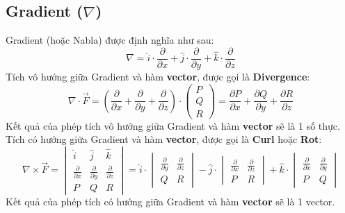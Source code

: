 \documentclass{article}
\begin{document}
\subsection{Gradient ($\nabla$)}
Gradient (hoặc Nabla) được định nghĩa như sau: 
\[\nabla = \hat{i}\cdot\frac{\partial}{\partial x}+\hat{j}\cdot\frac{\partial}{\partial y}+\hat{k}\cdot\frac{\partial}{\partial z}\]
Tích vô hướng giữa Gradient và hàm \textbf{vector}, được gọi là \textbf{Divergence}: 
\[\nabla\cdot \vec{F} = (\frac{\partial}{\partial x} + \frac{\partial}{\partial y} + \frac{\partial}{\partial z})\cdot\begin{pmatrix}
    P\\Q\\R
\end{pmatrix}=\frac{\partial P}{\partial x}+\frac{\partial Q}{\partial y}+\frac{\partial R}{\partial z}\]
Kết quả của phép tích vô hướng giữa Gradient và hàm \textbf{vector} sẽ là 1 số thực.\newline
Tích có hướng giữa Gradient và hàm \textbf{vector}, được gọi là \textbf{Curl} hoặc \textbf{Rot}: 
\[\nabla \times \vec{F}=\begin{vmatrix}
    \hat{i}&\hat{j}&\hat{k}\\
    \frac{\partial}{\partial x}&\frac{\partial}{\partial y}&\frac{\partial}{\partial z}\\
    P&Q&R
\end{vmatrix}=\hat{i}\cdot\begin{vmatrix}
    \frac{\partial}{\partial y}&\frac{\partial}{\partial z}\\
    Q&R
\end{vmatrix}-\hat{j}\cdot\begin{vmatrix}
    \frac{\partial}{\partial x}& \frac{\partial}{\partial z}\\
    P&R
\end{vmatrix}+\hat{k}\cdot\begin{vmatrix}
    \frac{\partial}{\partial x}&\frac{\partial}{\partial y}\\
    P&Q
\end{vmatrix}\]
Kết quả của phép tích có hướng giữa Gradient và hàm \textbf{vector} sẽ là 1 \textbf{}{vector}.
\end{document}
